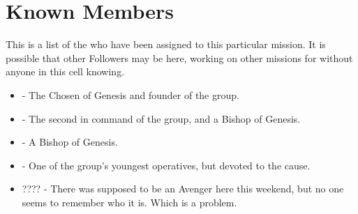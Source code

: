 \documentclass[blue]{GL2020}
\begin{document}
\section*{Known Members}
This is a list of the \pGoaties{} who have been assigned to this particular mission. It is possible that other Followers may be here, working on other missions for \cGenesis{} without anyone in this cell knowing.
\begin{itemize}
	\item \cChupLeader{\full} - The Chosen of Genesis and founder of the group.
	\item \cChupSecond{\full} - The second in command of the group, and a Bishop of Genesis.
	\item \cChupInventor{\full} - A Bishop of Genesis.
	\item \cChupStudent{\full} - One of the group's youngest operatives, but devoted to the cause.
	\item ???? - There was supposed to be an Avenger here this weekend, but no one seems to remember who it is. Which is a problem.
\end{itemize}
\end{document}
